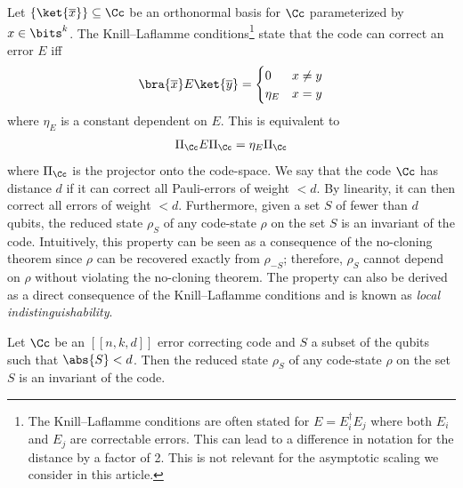 \documentclass{toc}
\begin{document}
Let $\{\ket{\overline{x}}\} \subseteq \Cc$ be an orthonormal basis for $\Cc$ parameterized by $x \in \bits^k$. The Knill--Laflamme conditions\footnote{The Knill--Laflamme conditions are often stated for $E = E_i^\dagger E_j$ where both $E_i$ and $E_j$ are correctable errors. This can lead to a difference in notation for the distance by a factor of 2. This is not relevant for the asymptotic scaling we consider in this %
article.}  %
state that the code can correct an error $E$ iff
\begin{align}
\bra{\overline x}E \ket{\overline y} = \begin{cases} 0 & x \neq y \\
\eta_E & x = y \end{cases}
\end{align}
where $\eta_E$ is a constant dependent on $E$. This is equivalent to
\begin{align}
\Pi_\Cc E \Pi_\Cc = \eta_E \Pi_\Cc \label{eq:kl-conditions}
\end{align}
where $\Pi_\Cc$ is the projector onto the code-space. We say that the code $\Cc$ has distance $d$ if it can correct all Pauli-errors of weight $<d$. By linearity, it can then correct all errors of weight $<d$. Furthermore, given a set $S$ of fewer than $d$ qubits, the reduced
%
state $\rho_S$ of any code-state $\rho$ on the set $S$ is an invariant of the code. Intuitively, this property can be seen as a consequence of the no-cloning theorem since $\rho$ can be recovered exactly from $\rho_{-S}$; therefore, $\rho_S$ cannot depend on $\rho$ without violating the no-cloning theorem. The property can also be derived as a direct consequence of the Knill--Laflamme conditions and is known as \emph{local indistinguishability}.

\begin{fact}
\label{fact:local-indistinguishability}
Let $\Cc$ be %
an  %
$[[n,k,d]]$ error correcting code and $S$ a subset of the qubits such that $\abs{S} < d$. Then the reduced %
state $\rho_S$ of any code-state $\rho$ on the set $S$ is an invariant of the code.
\end{fact}
\end{document}
